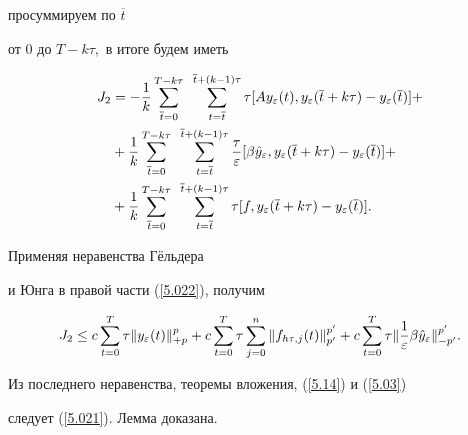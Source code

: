 \begin{pf}
просуммируем по $\overline{t}$


от $ 0 $ до $ T - k \tau ,$ в итоге будем иметь


\begin{align}


J_2 &= - \frac{1}{k} \sum^{T-k \tau}_{\overline{t} =0}{\ }


 \sum^{\overline{ t}+(k-1) \tau}_{t= \overline{t}}


\tau [ Ay_\varepsilon(t), y_\varepsilon


(\overline{t} +k \tau ) - y_\varepsilon (\overline{t} )]+\notag\\


%


&+ \frac{1}{k}


\sum^{T-k \tau}_{\overline{t} =0}{\ }


\sum^{\overline{ t}+(k-1) \tau}_{t= \overline{t}}


\frac{\tau}{\varepsilon} [ \beta\Hat{y}_\varepsilon,


y_\varepsilon ( \overline{t} + k \tau ) - y_\varepsilon


( \overline{t} ) ] +\notag \\


%


&+ \frac{1}{k}


\sum^{T-k \tau}_{\overline{t} =0}{\ }


\sum^{\overline{ t}+(k-1) \tau}_{t= \overline{t}}


\tau [ f , y_\varepsilon ( \overline{t}


+ k \tau )


- y_\varepsilon ( \overline{t} ) ].


\label{5.022}


\end{align}


Применяя неравенства Г\"ельдера


и Юнга в правой части (\ref{5.022}), получим


$$


J_2 \le c \sum^{T}_{t =0}


\tau \|  y_\varepsilon(t) \| ^{p}_{+p}


 + c \sum^{T}_{t=0}\tau\sum^{n}_{j=0}


\|  f_{h\tau,j}(t) \| ^{p'}_{p'} +


c\sum^{T}_{t=0}\tau\|


\frac{1}{\varepsilon} \beta \Hat{y}_\varepsilon


\|^{p'}_{-p'}.


$$


Из последнего неравенства, теоремы вложения, (\ref{5.14}) и (\ref{5.03})


следует (\ref{5.021}). Лемма доказана.\end{pf}


